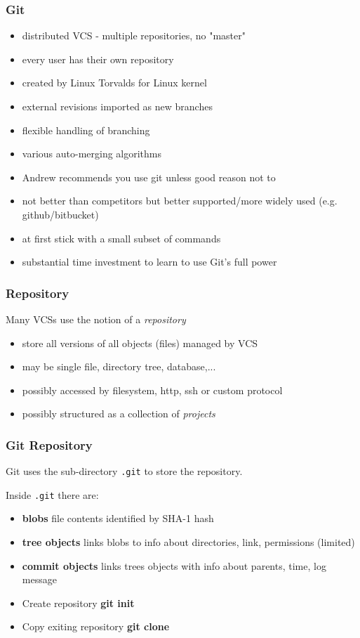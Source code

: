 \begin{frame}
\frametitle{Git}
\begin{itemize}
\item  distributed VCS - multiple repositories, no "master"
\item  every user has their own repository
\item  created by Linux Torvalds for Linux kernel
\item  external revisions imported as new branches
\item  flexible handling of branching
\item  various auto-merging algorithms
\item  Andrew recommends you use git unless good reason not to
\item  not better than competitors but better supported/more widely used (e.g. github/bitbucket)
\item  at first stick with a small subset of commands
\item  substantial time investment to learn to use Git's  full power
\end{itemize}
\end{frame}

\begin{frame}
\frametitle{Repository}
Many VCSs use the notion of a {\em{repository}}

\begin{itemize}
\item  store all versions of all objects (files) managed by VCS
\item  may be  single file, directory tree, database,...
\item  possibly accessed by filesystem, http, ssh or custom protocol
\item  possibly structured as a collection of {\em{projects}}
\end{itemize}


\end{frame}


\begin{frame}
\frametitle{Git Repository}
Git uses the sub-directory {\tt .git} to store the repository.

Inside  {\tt .git} there are:

\begin{itemize}
\item  {\bf blobs} file contents identified by SHA-1 hash
\item  {\bf tree objects} links blobs to info about directories, link, permissions (limited)
\item  {\bf commit objects} links trees objects with info about parents, time, log message
\end{itemize}

\begin{itemize}
\item  Create repository {\bf git init}
\item  Copy exiting repository {\bf git clone}
\end{itemize}
\end{frame}

